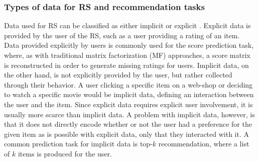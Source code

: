 \subsubsection*{Types of data for RS and recommendation tasks}
Data used for RS can be classified as either implicit or explicit \cite{oard1998implicit}.
Explicit data is provided by the user of the RS, such as a user providing a rating of an item.
Data provided explicitly by users is commonly used for the score prediction task, where, as with traditional matrix factorization (MF) approaches, a score matrix is reconstructed in order to generate missing ratings for users.
Implicit data, on the other hand, is not explicitly provided by the user, but rather collected through their behavior.
A user clicking a specific item on a web-shop or deciding to watch a specific movie would be implicit data, defining an interaction between the user and the item.
Since explicit data requires explicit user involvement, it is usually more scarce than implicit data.
A problem with implicit data, however, is that it does not directly encode whether or not the user had a preference for the given item as is possible with explicit data, only that they interacted with it.
A common prediction task for implicit data is top-$k$ recommendation, where a list of $k$ items is produced for the user.

